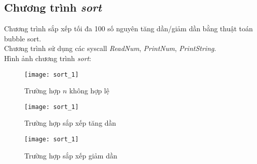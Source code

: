 \subsection{Chương trình \textit{sort}}
Chương trình sắp xếp tối đa 100 số nguyên tăng dần/giảm dần bằng thuật toán bubble sort.\\
Chương trình sử dụng các syscall \textit{ReadNum}, \textit{PrintNum}, \textit{PrintString}.\\
Hình ảnh chương trình \textit{sort}:
\begin{figure}[H]
\begin{center}
\texttt{[image: sort\_1]}
\end{center}
\caption{Trường hợp $n$ không hợp lệ}
\end{figure}

\begin{figure}[H]
\begin{center}
\texttt{[image: sort\_1]}
\end{center}
\caption{Trường hợp sắp xếp tăng dần}
\end{figure}

\begin{figure}[H]
\begin{center}
\texttt{[image: sort\_1]}
\end{center}
\caption{Trường hợp sắp xếp giảm dần}
\end{figure}